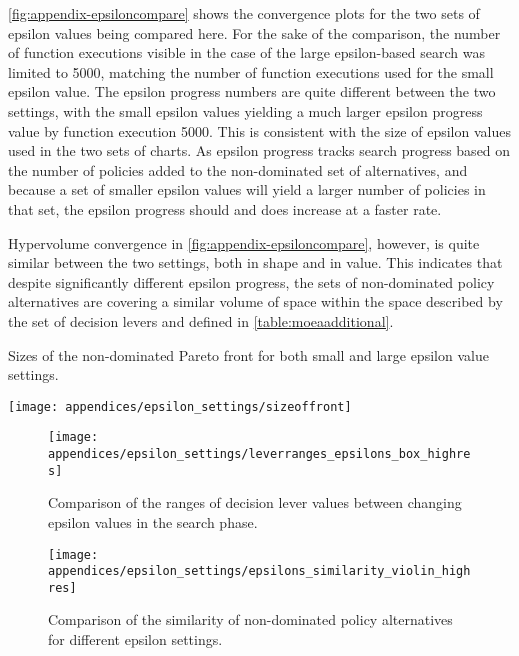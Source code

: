 \cref{fig:appendix-epsiloncompare} shows the convergence plots for the two sets of epsilon values being compared here. For the sake of the comparison, the number of function executions visible in the case of the large epsilon-based search was limited to 5000, matching the number of function executions used for the small epsilon value. The epsilon progress numbers are quite different between the two settings, with the small epsilon values yielding a much larger epsilon progress value by function execution 5000. This is consistent with the size of epsilon values used in the two sets of charts. As epsilon progress tracks search progress based on the number of policies added to the non-dominated set of alternatives, and because a set of smaller epsilon values will yield a larger number of policies in that set, the epsilon progress should and does increase at a faster rate. 

Hypervolume convergence in \cref{fig:appendix-epsiloncompare}, however, is quite similar between the two settings, both in shape and in value. This indicates that despite significantly different epsilon progress, the sets of non-dominated policy alternatives are covering a similar volume of space within the space described by the set of decision levers and defined in \cref{table:moeaadditional}. 

\begin{table}[h]
    \centering
    \captionsetup{width=0.7\textwidth}
    \caption{Sizes of the non-dominated Pareto front for both small and large epsilon value settings.}
    \label{table:appendix-epsilon-paretosize}
    
    \texttt{[image: appendices/epsilon\_settings/sizeoffront]}
\end{table}

\begin{figure}[h]
    \centering
    \captionsetup{width=\textwidth}
    
    \texttt{[image: appendices/epsilon\_settings/leverranges\_epsilons\_box\_highres]}
    
    \caption[Comparing decision lever values with different epsilon value settings]{Comparison of the ranges of decision lever values between changing epsilon values in the search phase.}
    \label{fig:appendix-epsilondecisionlevers}
\end{figure}

\begin{figure}[h]
    \centering
    \captionsetup{width=0.5\textwidth}
    
    \texttt{[image: appendices/epsilon\_settings/epsilons\_similarity\_violin\_highres]}
    
    \caption[Comparing similarity of alternatives with different epsilon value settings]{Comparison of the similarity of non-dominated policy alternatives for different epsilon settings.}
    \label{fig:appendix-epsilonsimilarity}
\end{figure}

